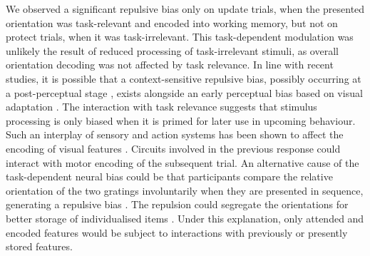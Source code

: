 \documentclass{article}
\begin{document}
We observed a significant repulsive bias only on update trials, when the presented orientation was task-relevant and encoded into working memory, but not on protect trials, when it was task-irrelevant. This task-dependent modulation was unlikely the result of reduced processing of task-irrelevant stimuli, as overall orientation decoding was not affected by task relevance. In line with recent studies, it is possible that a context-sensitive repulsive bias, possibly occurring at a post-perceptual stage \parencite{Zamboni2016, Fritsche2019}, exists alongside an early perceptual bias based on visual adaptation \parencite{Fritsche2017}. The interaction with task relevance suggests that stimulus processing is only biased when it is primed for later use in upcoming behaviour. Such an interplay of sensory and action systems has been shown to affect the encoding of visual features \parencite{VanEde2019, Boettcher2021, Myers2017a}. Circuits involved in the previous response could interact with motor encoding of the subsequent trial. An alternative cause of the task-dependent neural bias could be that participants compare the relative orientation of the two gratings involuntarily when they are presented in sequence, generating a repulsive bias \parencite{Bae2017, Czoschke2019, Czoschke2020, Chunharas2019}. The repulsion could segregate the orientations for better storage of individualised items \parencite[e.g. ][]{Wei2012}. Under this explanation, only attended and encoded features would be subject to interactions with previously or presently stored features.
\end{document}
